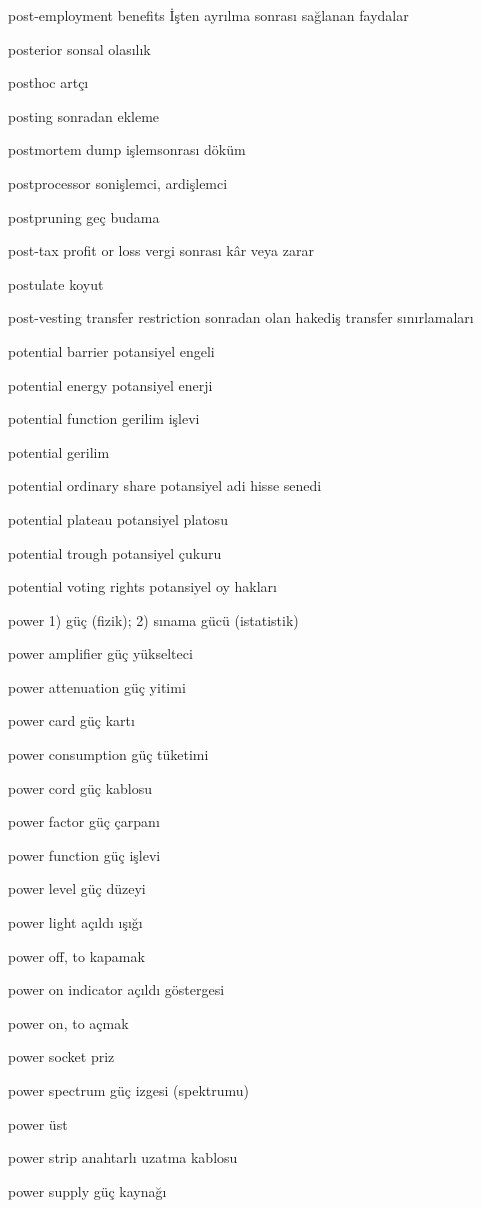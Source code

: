 \documentclass[12pt,fleqn]{article}\usepackage{../../common}
\begin{document}
post-employment benefits İşten ayrılma sonrası sağlanan faydalar

posterior sonsal olasılık

posthoc artçı

posting sonradan ekleme

postmortem dump işlemsonrası döküm

postprocessor sonişlemci, ardişlemci

postpruning geç budama

post-tax profit or loss vergi sonrası kâr veya zarar

postulate koyut

post-vesting transfer restriction sonradan olan hakediş transfer sınırlamaları

potential barrier potansiyel engeli

potential energy potansiyel enerji

potential function gerilim işlevi

potential gerilim

potential ordinary share potansiyel adi hisse senedi

potential plateau potansiyel platosu

potential trough potansiyel çukuru

potential voting rights potansiyel oy hakları

power 1) güç (fizik); 2) sınama gücü (istatistik)

power amplifier güç yükselteci

power attenuation güç yitimi

power card güç kartı

power consumption güç tüketimi

power cord güç kablosu

power factor güç çarpanı

power function güç işlevi

power level güç düzeyi

power light açıldı ışığı

power off, to kapamak

power on indicator açıldı göstergesi

power on, to açmak

power socket priz

power spectrum güç izgesi (spektrumu)

power üst

power strip anahtarlı uzatma kablosu

power supply güç kaynağı
\end{document}

